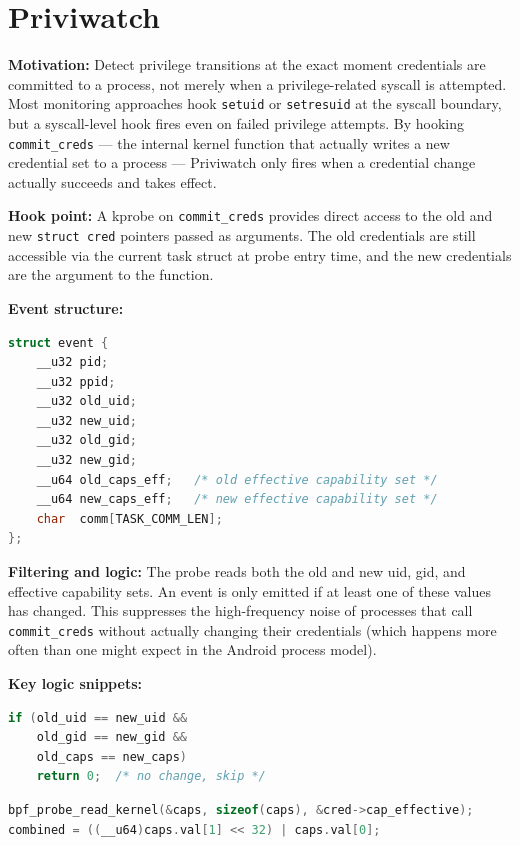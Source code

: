 \documentclass{mnitjaipur}
\begin{document}
\section{Priviwatch}
\label{sec:priviwatch}
\textbf{Motivation:} Detect privilege transitions at the exact moment credentials are committed to a process, not merely when a privilege-related syscall is attempted. Most monitoring approaches hook \texttt{setuid} or \texttt{setresuid} at the syscall boundary, but a syscall-level hook fires even on failed privilege attempts. By hooking \texttt{commit\_creds} — the internal kernel function that actually writes a new credential set to a process — Priviwatch only fires when a credential change actually succeeds and takes effect.

\textbf{Hook point:} A kprobe on \texttt{commit\_creds} provides direct access to the old and new \texttt{struct cred} pointers passed as arguments. The old credentials are still accessible via the current task struct at probe entry time, and the new credentials are the argument to the function.

\textbf{Event structure:}
\begin{lstlisting}[language=C,caption={Priviwatch event structure}]
struct event {
    __u32 pid;
    __u32 ppid;
    __u32 old_uid;
    __u32 new_uid;
    __u32 old_gid;
    __u32 new_gid;
    __u64 old_caps_eff;   /* old effective capability set */
    __u64 new_caps_eff;   /* new effective capability set */
    char  comm[TASK_COMM_LEN];
};
\end{lstlisting}

\textbf{Filtering and logic:} The probe reads both the old and new uid, gid, and effective capability sets. An event is only emitted if at least one of these values has changed. This suppresses the high-frequency noise of processes that call \texttt{commit\_creds} without actually changing their credentials (which happens more often than one might expect in the Android process model).

\textbf{Key logic snippets:}
\begin{lstlisting}[language=C,caption={Priviwatch change detection filter}]
if (old_uid == new_uid &&
    old_gid == new_gid &&
    old_caps == new_caps)
    return 0;  /* no change, skip */
\end{lstlisting}

\begin{lstlisting}[language=C,caption={Priviwatch safe capability read (avoiding CO-RE relocation)}]
bpf_probe_read_kernel(&caps, sizeof(caps), &cred->cap_effective);
combined = ((__u64)caps.val[1] << 32) | caps.val[0];
\end{lstlisting}
\end{document}
